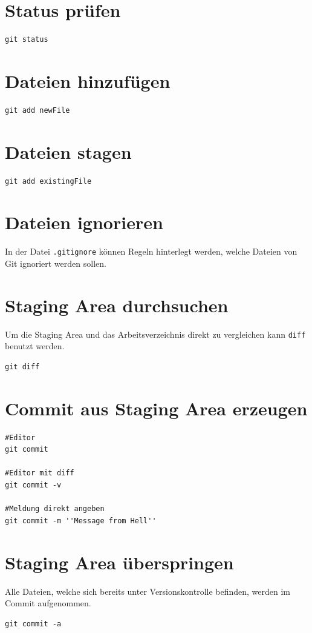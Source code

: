 \section{Status prüfen}
\begin{lstlisting}[caption={Status},captionpos=b]
git status
\end{lstlisting}
\section{Dateien hinzufügen}
\begin{lstlisting}[caption={Add},captionpos=b]
git add newFile
\end{lstlisting}
\section{Dateien stagen}
\begin{lstlisting}[caption={Stage},captionpos=b]
git add existingFile
\end{lstlisting}
\section{Dateien ignorieren}
In der Datei \texttt{.gitignore} können Regeln hinterlegt werden, welche Dateien von Git ignoriert werden sollen.
\section{Staging Area durchsuchen}
Um die Staging Area und das Arbeitsverzeichnis direkt zu vergleichen kann \texttt{diff} benutzt werden.
\begin{lstlisting}[caption={Diff},captionpos=b]
git diff
\end{lstlisting}
\section{Commit aus Staging Area erzeugen}
\begin{lstlisting}[caption={Commit},captionpos=b]
#Editor
git commit

#Editor mit diff
git commit -v

#Meldung direkt angeben
git commit -m ''Message from Hell''
\end{lstlisting}
\section{Staging Area überspringen}
Alle Dateien, welche sich bereits unter Versionskontrolle befinden, werden im Commit aufgenommen.
\begin{lstlisting}[caption={Commit w/o Staging Area},captionpos=b]
git commit -a
\end{lstlisting}
